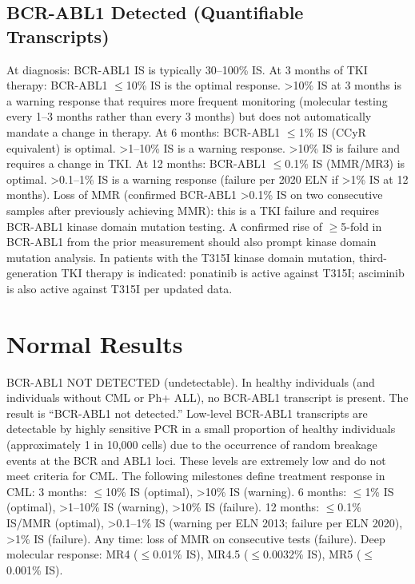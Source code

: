 \subsection*{BCR-ABL1 Detected (Quantifiable Transcripts)}
At diagnosis: BCR-ABL1 IS is typically 30--100\% IS. At 3 months of TKI therapy: BCR-ABL1 $\leq$10\% IS is the optimal response. >10\% IS at 3 months is a warning response that requires more frequent monitoring (molecular testing every 1--3 months rather than every 3 months) but does not automatically mandate a change in therapy. At 6 months: BCR-ABL1 $\leq$1\% IS (CCyR equivalent) is optimal. >1--10\% IS is a warning response. >10\% IS is failure and requires a change in TKI. At 12 months: BCR-ABL1 $\leq$0.1\% IS (MMR/MR3) is optimal. >0.1--1\% IS is a warning response (failure per 2020 ELN if >1\% IS at 12 months). Loss of MMR (confirmed BCR-ABL1 >0.1\% IS on two consecutive samples after previously achieving MMR): this is a TKI failure and requires BCR-ABL1 kinase domain mutation testing. A confirmed rise of $\geq$5-fold in BCR-ABL1 from the prior measurement should also prompt kinase domain mutation analysis. In patients with the T315I kinase domain mutation, third-generation TKI therapy is indicated: ponatinib is active against T315I; asciminib is also active against T315I per updated data.

\section*{Normal Results}
BCR-ABL1 NOT DETECTED (undetectable). In healthy individuals (and individuals without CML or Ph+ ALL), no BCR-ABL1 transcript is present. The result is ``BCR-ABL1 not detected.'' Low-level BCR-ABL1 transcripts are detectable by highly sensitive PCR in a small proportion of healthy individuals (approximately 1 in 10,000 cells) due to the occurrence of random breakage events at the BCR and ABL1 loci. These levels are extremely low and do not meet criteria for CML. The following milestones define treatment response in CML: 3 months: $\leq$10\% IS (optimal), >10\% IS (warning). 6 months: $\leq$1\% IS (optimal), >1--10\% IS (warning), >10\% IS (failure). 12 months: $\leq$0.1\% IS/MMR (optimal), >0.1--1\% IS (warning per ELN 2013; failure per ELN 2020), >1\% IS (failure). Any time: loss of MMR on consecutive tests (failure). Deep molecular response: MR4 ($\leq$0.01\% IS), MR4.5 ($\leq$0.0032\% IS), MR5 ($\leq$0.001\% IS).

